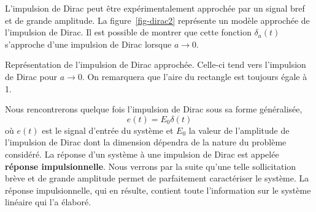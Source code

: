 \begin{figure}[!h]
    \centering
    
\end{figure}
L'impulsion de Dirac peut être expérimentalement approchée par un signal 
bref et de grande amplitude. La figure~\ref{fig-dirac2} représente un modèle 
approchée de l'impulsion de Dirac. Il est possible de montrer que cette fonction
$\delta_a(t)$ s'approche d'une impulsion de Dirac lorsque $a\to0$.
\begin{marginfigure}
    \centering
    
    \caption{Représentation de l'impulsion de Dirac approchée. 
             Celle-ci tend vers l'impulsion de Dirac pour $a\to0$. 
             On remarquera que l'aire du rectangle est toujours égale à 1.
             \label{fig-dirac2}}
\end{marginfigure}
Nous rencontrerons quelque fois l'impulsion de Dirac sous sa forme généralisée, 
\[
e(t)=E_0\delta(t)
\]
où $e(t)$ est le signal d'entrée du système et $E_0$ la valeur de l'amplitude 
de l'impulsion de Dirac dont la dimension dépendra de la nature du 
problème considéré.
La réponse d'un système à une impulsion de Dirac est appelée 
\textbf{réponse impulsionnelle}.
Nous verrons par la suite qu'une telle sollicitation brève et de grande 
amplitude permet de parfaitement caractériser le système. La réponse 
impulsionnelle, qui en résulte, contient toute l'information sur le système 
linéaire qui l'a élaboré.
